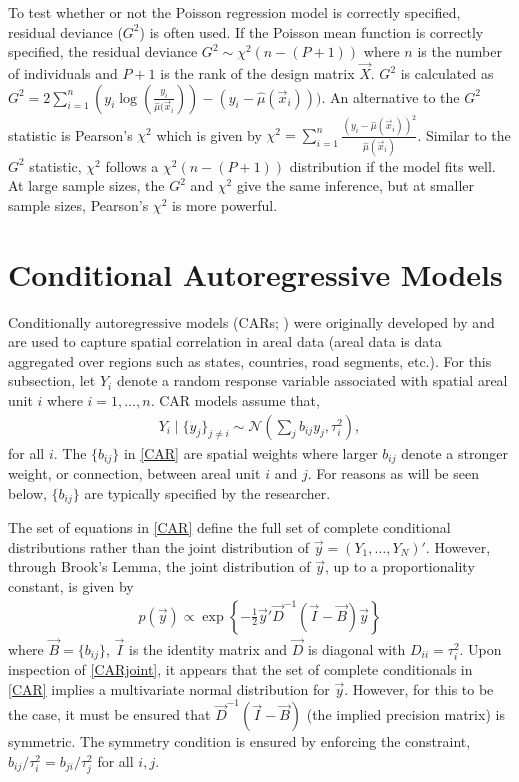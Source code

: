 To test whether or not the Poisson regression model is correctly specified, residual deviance ($G^2$) is often used. If the Poisson mean function is correctly specified, the residual deviance $G^2 \sim \chi^2(n-(P+1))$ where $n$ is the number of  individuals and $P+1$ is the rank of the design matrix $\vec{X}$. $G^2$ is calculated as $G^2=2\sum\limits_{i=1}^n(y_i \log(\frac{y_i}{\hat{\mu}(\vec{x}_i})) - (y_i - \hat{\mu}(\vec{x}_i)))$. An alternative to the $G^2$ statistic is Pearson's $\chi^2$ which is given by  $\chi^2=\sum_{i=1}^n \frac{(y_i-\hat{\mu}(\vec{x}_i))^2}{\hat{\mu}(\vec{x}_i)}$. Similar to the $G^2$ statistic, $\chi^2$ follows a $\chi^2(n-(P+1))$ distribution if the model fits well. At large sample sizes, the $G^2$ and $\chi^2$ give the same inference, but at smaller sample sizes, Pearson's $\chi^2$ is more powerful. 






\section{Conditional Autoregressive Models}
Conditionally autoregressive models (CARs; \citet{banerjee15,cressie11}) were originally developed by \citet{besag1974} and are used to capture spatial correlation in areal data (areal data is data aggregated over regions such as states, countries, road segments, etc.).  For this subsection, let $Y_i$ denote a random response variable associated with spatial areal unit $i$ where $i=1,\dots,n$.  CAR models assume that,
\begin{align}
Y_i \mid \{y_j\}_{j\neq i} \sim \mathcal{N}\left( \sum\limits_j   b_{ij} y_j, \tau_i^2 \right),
\label{CAR}
\end{align}
for all $i$.  The $\{b_{ij}\}$ in \eqref{CAR} are spatial weights where larger $b_{ij}$ denote a stronger weight, or connection, between areal unit $i$ and $j$.  For reasons as will be seen below, $\{b_{ij}\}$ are typically specified by the researcher.

The set of equations in \eqref{CAR} define the full set of complete conditional distributions rather than the joint distribution of $\vec{y} = (Y_1,\dots,Y_N)'$.  However,  through Brook's Lemma,  the joint distribution of $\vec{y}$, up to a proportionality constant, is given by
\begin{align}
p(\vec{y}) \propto  \exp \left\{   -\frac{1}{2}\vec{y}' \vec{D}^{-1}(\vec{I} - \vec{B})\vec{y}  \right\}
\label{CARjoint}
\end{align}
where $\vec{B} = \{ b_{ij}\}$, $\vec{I}$ is the identity matrix and $\vec{D}$ is diagonal with $D_{ii} = \tau_i^2$. Upon inspection of \eqref{CARjoint}, it appears that the set of complete conditionals in \eqref{CAR} implies a multivariate normal distribution for $\vec{y}$.  However, for this to be the case, it must be ensured that $\vec{D}^{-1}(\vec{I} - \vec{B})$ (the implied precision matrix) is symmetric. The symmetry condition is ensured by enforcing the constraint, $b_{ij}/\tau_i^2 = b_{ji}/\tau_j^2$ for all $i,j$.

